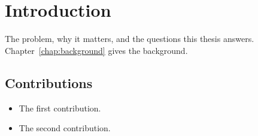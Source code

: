\chapter{Introduction}
\label{chap:introduction}

The problem, why it matters, and the questions this thesis answers.
Chapter~\ref{chap:background} gives the background.

\section{Contributions}
\begin{itemize}
  \item The first contribution.
  \item The second contribution.
\end{itemize}
